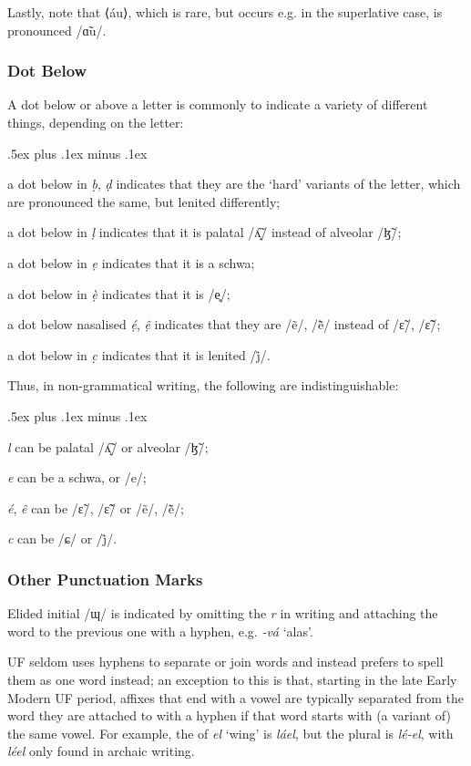 \documentclass[a4paper, 12pt, twoside, final]{article}
\let \w \textit
\begin{document}
Lastly, note that ⟨áu⟩, which is rare, but occurs e.g. in the superlative case, is pronounced /ɑ̃u/.

\subsubsection{Dot Below}
A dot below or above a letter is commonly to indicate
a variety of different things, depending on the letter:
\begin{items}\itemsep .5ex plus .1ex minus .1ex\relax
\item a dot below in \w{ḅ}, \w{ḍ} indicates that they are the ‘hard’ variants of the letter, which are pronounced
      the same, but lenited differently;
\item a dot below in \w{ḷ} indicates that it is palatal /ʎ̝̃/ instead of alveolar /ɮ̃/;
\item a dot below in \w{ẹ} indicates that it is a schwa;
\item a dot below in \w{ẹ̀} indicates that it is /e̥/;
\item a dot below nasalised \w{ẹ́}, \w{ệ} indicates that they are /ẽ/, /ẽ̃/ instead of /ɛ̃/, /ɛ̃̃/;
\item a dot below in \w{c̣} indicates that it is lenited /j̊/.
\end{items}

\noindent Thus, in non-grammatical writing, the following are indistinguishable:
\begin{items}\itemsep .5ex plus .1ex minus .1ex\relax
\item \w{l} can be palatal /ʎ̝̃/ or alveolar /ɮ̃/;
\item \w{e} can be a schwa, or /e/;
\item \w{é}, \w{ê} can be /ɛ̃/, /ɛ̃̃/ or /ẽ/, /ẽ̃/;
\item \w{c} can be /ɕ/ or /j̊/.
\end{items}

\subsubsection{Other Punctuation Marks}
\noindent Elided initial /ɰ/ is indicated by omitting the \w{r} in writing and attaching the word to the previous one with a hyphen,
e.g. \w{-vá} ‘alas’.

UF seldom uses hyphens to separate or join words and instead prefers to spell them as one word instead; an exception
to this is that, starting in the late Early Modern UF period, affixes that end with a vowel are typically separated
from the word they are attached to with a hyphen if that word starts with (a variant of) the same vowel. For example,
the  of \w{el} ‘wing’ is \w{láel}, but the plural is \w{lé-el}, with \w{léel} only found in archaic
writing.
\end{document}
